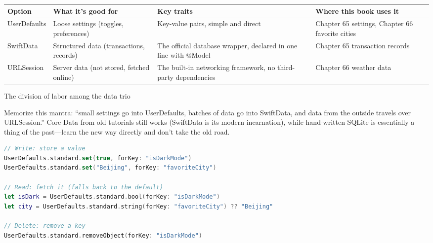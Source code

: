 


\begin{center}
\begin{tabularx}{\linewidth}{|X|X|X|X|}
\hline
\textbf{Option} & \textbf{What it's good for} & \textbf{Key traits} & \textbf{Where this book uses it} \tabularnewline
\hline
UserDefaults & Loose settings (toggles, preferences) & Key-value pairs, simple and direct & Chapter 65 settings, Chapter 66 favorite cities \tabularnewline
SwiftData & Structured data (transactions, records) & The official database wrapper, declared in one line with @Model & Chapter 65 transaction records \tabularnewline
URLSession & Server data (not stored, fetched online) & The built-in networking framework, no third-party dependencies & Chapter 66 weather data \tabularnewline
\hline
\end{tabularx}
\end{center}

\begin{center}\small\color{gray}The division of labor among the data trio\end{center}

Memorize this mantra: “small settings go into UserDefaults, batches of data go into SwiftData, and data from the outside travels over URLSession.” Core Data from old tutorials still works (SwiftData is its modern incarnation), while hand-written SQLite is essentially a thing of the past—learn the new way directly and don't take the old road.


\begin{lstlisting}[language=Swift]
// Write: store a value
UserDefaults.standard.set(true, forKey: "isDarkMode")
UserDefaults.standard.set("Beijing", forKey: "favoriteCity")

// Read: fetch it (falls back to the default)
let isDark = UserDefaults.standard.bool(forKey: "isDarkMode")
let city = UserDefaults.standard.string(forKey: "favoriteCity") ?? "Beijing"

// Delete: remove a key
UserDefaults.standard.removeObject(forKey: "isDarkMode")
\end{lstlisting}

